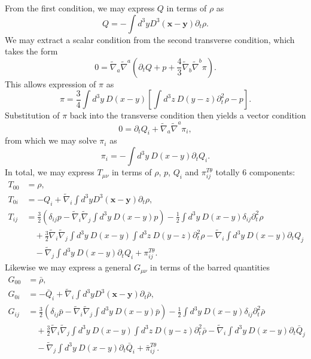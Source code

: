\documentclass[10pt,letterpaper]{article}
\numberwithin{equation}{subsection}
\begin{document}
From the first condition, we may express $Q$ in terms of $\rho$ as
\begin{equation}
Q = -\int d^3y D^3(\mathbf x-\mathbf y) \partial_t  \rho.
\end{equation}
We may extract a scalar condition from the second transverse condition, which takes the form
\begin{equation}
0 = \tilde\nabla_a\tilde\nabla^a (\partial_t Q +  p + \frac43 \tilde\nabla_b\tilde\nabla^b \pi).
\end{equation}
This allows expression of $\pi$ as
\begin{equation}
\pi = \frac34 \int d^3y\ D(x-y) \left[ \int d^3z\ D(y-z) \partial_t ^2 \rho - p\right].
\end{equation}
Substitution of $\pi$ back into the transverse condition then yields a vector condition
\begin{equation}
0=\partial_t Q_i + \tilde\nabla_a\tilde\nabla^a \pi_i,
\end{equation}
from which we may solve $\pi_i$ as
\begin{equation}
\pi_i = -\int d^3y\ D(x-y)\partial_t Q_i.
\end{equation}
In total, we may express $T_{\mu\nu}$ in terms of $\rho$, $p$, $Q_i$ and $\pi_{ij}^{T\theta}$ totally 6 components:
\begin{align}
 T_{00}  &= \rho,
\nonumber\\	
 T_{0i} &= -Q_i + \tilde\nabla_i \int d^3y D^3(\mathbf x-\mathbf y) \partial_t  \rho,
\nonumber\\	
 T_{ij}  &= \frac32 \left( \delta_{ij}p - \tilde\nabla_i \tilde\nabla_j \int d^3y\ D(x-y) p\right) - \frac12 \int d^3y\ D(x-y) \delta_{ij} \partial_t^2 \rho 
\nonumber\\
&\quad {}+  \frac32
\tilde\nabla_i\tilde\nabla_j  \int d^3y\ D(x-y) \int d^3z\ D(y-z) \partial_t^2 \rho - \tilde\nabla_i  \int d^3y\ D(x-y) \partial_t Q_j
\nonumber \\
&\quad{}
- \tilde\nabla_j  \int d^3y\ D(x-y) \partial_t Q_i + \pi_{ij}^{T\theta}.
\end{align} 
Likewise we may express a general $G_{\mu\nu}$ in terms of the barred quantities 
\begin{align}
 G_{00}  &= \bar \rho,
\nonumber\\	
 G_{0i} &= -\bar Q_i + \tilde\nabla_i \int d^3y D^3(\mathbf x-\mathbf y) \partial_t  \bar \rho,
\nonumber\\	
 G_{ij}  &= \frac32 \left( \delta_{ij}\bar p - \tilde\nabla_i \tilde\nabla_j \int d^3y\ D(x-y) \bar p\right) - \frac12 \int d^3y\ D(x-y) \delta_{ij} \partial_t^2 \bar \rho 
\nonumber\\
&\quad {}+  \frac32
\tilde\nabla_i\tilde\nabla_j  \int d^3y\ D(x-y) \int d^3z\ D(y-z) \partial_t^2 \bar \rho - \tilde\nabla_i  \int d^3y\ D(x-y) \partial_t \bar Q_j
\nonumber \\
&\quad{}
- \tilde\nabla_j  \int d^3y\ D(x-y) \partial_t \bar Q_i + \bar \pi_{ij}^{T\theta}.
\end{align} 
\end{document}
